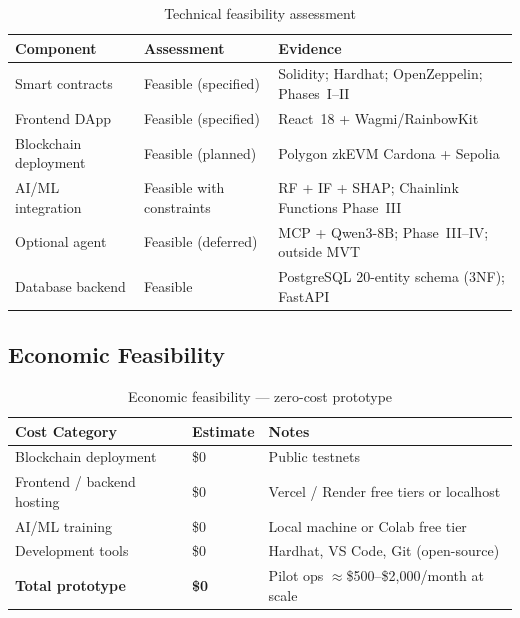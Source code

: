 \documentclass[12pt, a4paper]{report}
\newcommand{\tableheadcolor}{\rowcolor{TableHeadBg}}
\begin{document}
\begin{table}[H]
\centering
\caption[Technical feasibility assessment]{Technical feasibility assessment}
\label{tab:tech-feasibility}
\begin{tabular}{p{3cm}p{3cm}p{7.5cm}}
\toprule
\tableheadcolor
\textbf{Component} & \textbf{Assessment} & \textbf{Evidence} \\
\midrule
Smart contracts & Feasible (specified) & Solidity; Hardhat; OpenZeppelin; Phases~I--II \\
Frontend DApp & Feasible (specified) & React~18 + Wagmi/RainbowKit \\
Blockchain deployment & Feasible (planned) & Polygon zkEVM Cardona + Sepolia \\
AI/ML integration & Feasible with constraints & RF + IF + SHAP; Chainlink Functions Phase~III \\
Optional agent & Feasible (deferred) & MCP + Qwen3-8B; Phase~III--IV; outside MVT \\
Database backend & Feasible & PostgreSQL 20-entity schema (3NF); FastAPI \\
\bottomrule
\end{tabular}
\end{table}

\vspace{2pt}

\subsection{Economic Feasibility}

\begin{table}[H]
\centering
\caption[Economic feasibility --- zero-cost prototype]{Economic feasibility --- zero-cost prototype}
\label{tab:economic-feasibility}
\begin{tabular}{p{4cm}p{2.5cm}p{7cm}}
\toprule
\tableheadcolor
\textbf{Cost Category} & \textbf{Estimate} & \textbf{Notes} \\
\midrule
Blockchain deployment & \$0 & Public testnets \\
Frontend / backend hosting & \$0 & Vercel / Render free tiers or localhost \\
AI/ML training & \$0 & Local machine or Colab free tier \\
Development tools & \$0 & Hardhat, VS Code, Git (open-source) \\
\textbf{Total prototype} & \textbf{\$0} & Pilot ops $\approx$\$500--\$2{,}000/month at scale \\
\bottomrule
\end{tabular}
\end{table}
\end{document}
